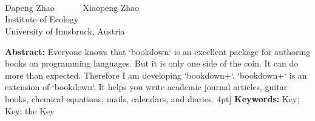 \begin{center}
\parbox{\textwidth}{
\\[5pt]

\\[5pt]
}
\end{center}

\begin{center}
\\[7pt]
\normalsize
Dapeng Zhao~~~~~~
Xiaopeng Zhao~~~~~~
\\[7pt]
\xiaowuhao Institute of Ecology\\
University of Innsbruck, Austria\\[10pt]
\end{center}
\begin{center}
\parbox{\textwidth}{
\textbf{Abstract:} 
Everyone knows that `bookdown` is an excellent package for authoring books on programming languages. But it is only one side of the coin.  It can do more than expected. Therefore I am developing `bookdown+`. `bookdown+` is an extension of `bookdown`. It helps you write academic journal articles, guitar books, chemical equations, mails, calendars, and diaries.
4pt]
\textbf{Keywords:} 
Key; Key; the Key
}

\end{center}
